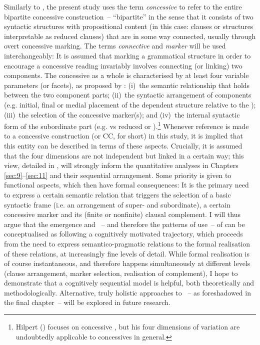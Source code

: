 Similarly to \citet[633]{König1991b}, the present study uses the term \textit{concessive} to refer to the entire bipartite concessive construction~– “bipartite” in the sense that it consists of two syntactic structures with propositional content (in this case: clauses or structures interpretable as reduced clauses) that are in some way connected, usually through overt concessive marking. The terms \textit{connective} and \textit{marker} will be used interchangeably: It is assumed that marking a grammatical structure in order to encourage a concessive reading invariably involves connecting (or linking) two components. The concessive as a whole is characterised by at least four variable parameters (or facets), as proposed by \citet[176]{Hilpert2013a}:
(i)~the semantic relationship that holds between the two component parts;
(ii)~the syntactic arrangement of components (e.g. initial, final or medial placement of the dependent structure relative to the );
(iii)~the selection of the concessive marker(s); and
(iv)~the internal syntactic form of the subordinate part (e.g.  vs reduced or ).\footnote{Hilpert (\citeyear{Hilpert2013a}) focuses on concessive , but his four dimensions of variation are undoubtedly applicable to concessives in general.} Whenever reference is made to a concessive construction (or CC, for short) in this study, it is implied that this entity can be described in terms of these aspects. Crucially, it is assumed that the four dimensions are not independent but linked in a certain way; this view, detailed in , will strongly inform the quantitative analyses in Chapters \ref{sec:9}–\ref{sec:11} and their sequential arrangement. Some priority is given to functional aspects, which then have formal consequences: It is the primary need to express a certain semantic relation that triggers the selection of a basic syntactic frame (i.e. an arrangement of super- and subordinate), a certain concessive marker and its (finite or nonfinite) clausal complement. I will thus argue that the emergence and ~– and therefore the patterns of use~– of  can be conceptualised as following a cognitively motivated trajectory, which proceeds from the need to express semantico-pragmatic relations to the formal realisation of these relations, at increasingly fine levels of detail. While formal realisation is of course instantaneous, and therefore happens simultaneously at different levels (clause arrangement, marker selection, realisation of complement), I hope to demonstrate that a cognitively sequential model is helpful, both theoretically and methodologically. Alternative, truly holistic approaches to ~– as foreshadowed in the final chapter~– will be explored in future research.

